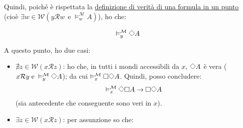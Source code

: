 \documentclass[a4paper,12pt]{article}
\newcommand{\Dmd}{\mathord{\vcenter{\hbox{\tikz[baseline=-0.6ex]{\draw[line width=0.4pt, scale=1, rotate=45] (0,0) rectangle (0.2,0.2);}}}}} %
\begin{document}
\begin{dimo}
\begin{enumerate}
		      Quindi, poiché è rispettata la \hyperlink{defverp}{definizione di verità di una formula in un punto} (cioè $\exists w \in \mathcal{W} (y\mathcal{R}w \;\, \text{e} \; \vDash_w^{\mathcal{M}} A)$), ho che:

		      \begin{minipage}{0.48\textwidth}
			      $$\vDash_y^{\mathcal{M}} \Dmd A$$
		      \end{minipage}
		      \begin{minipage}{0.48\textwidth}
			      \begin{center}
			      \end{center}
		      \end{minipage}
		      \vspace{0pt}

		      A questo punto, ho due casi:
		      \begin{itemize}
			      \item $\nexists z \in \mathcal{W} (x\mathcal{R}z)$: ho che, in tutti i mondi accessibili da $x$, $\Dmd A$ è vera ($x\mathcal{R}y \; \text{e} \; \vDash_y^{\mathcal{M}} \Dmd A$); da cui $\vDash_x^{\mathcal{M}} \Box \Dmd A$. Quindi, posso concludere:
			            $$\vDash_x^{\mathcal{M}} \Dmd \Box A \to \Box \Dmd A$$
			            (sia antecedente che conseguente sono veri in $x$).
			      \item $\exists z \in \mathcal{W} (x\mathcal{R}z)$: per assunzione so che:


\end{itemize}
\end{enumerate}
\end{dimo}
\end{document}
